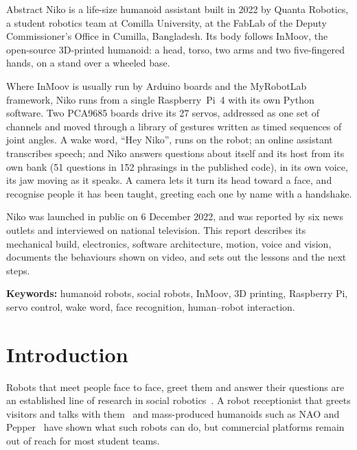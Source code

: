 \documentclass[11pt]{article}
\begin{document}
\vspace{6pt}
\begin{summarybox}{Abstract}
Niko is a life-size humanoid assistant built in 2022 by Quanta Robotics, a student robotics team at Comilla University, at the FabLab of the Deputy Commissioner's Office in Cumilla, Bangladesh. Its body follows InMoov, the open-source 3D-printed humanoid: a head, torso, two arms and two five-fingered hands, on a stand over a wheeled base.

Where InMoov is usually run by Arduino boards and the MyRobotLab framework, Niko runs from a single Raspberry~Pi~4 with its own Python software. Two PCA9685 boards drive its 27 servos, addressed as one set of channels and moved through a library of gestures written as timed sequences of joint angles. A wake word, ``Hey Niko'', runs on the robot; an online assistant transcribes speech; and Niko answers questions about itself and its host from its own bank (51 questions in 152 phrasings in the published code), in its own voice, its jaw moving as it speaks. A camera lets it turn its head toward a face, and recognise people it has been taught, greeting each one by name with a handshake.

Niko was launched in public on 6 December 2022, and was reported by six news outlets and interviewed on national television. This report describes its mechanical build, electronics, software architecture, motion, voice and vision, documents the behaviours shown on video, and sets out the lessons and the next steps.

\smallskip
{\sffamily\small\textbf{Keywords:} humanoid robots, social robots, InMoov, 3D printing, Raspberry Pi, servo control, wake word, face recognition, human--robot interaction.}
\end{summarybox}

\section{Introduction}

Robots that meet people face to face, greet them and answer their questions are an established line of research in social robotics~\cite{fong2003survey,breazeal2003sociable}. A robot receptionist that greets visitors and talks with them~\cite{gockley2005valerie} and mass-produced humanoids such as NAO and Pepper~\cite{gouaillier2009nao,pandey2018pepper} have shown what such robots can do, but commercial platforms remain out of reach for most student teams.
\end{document}

